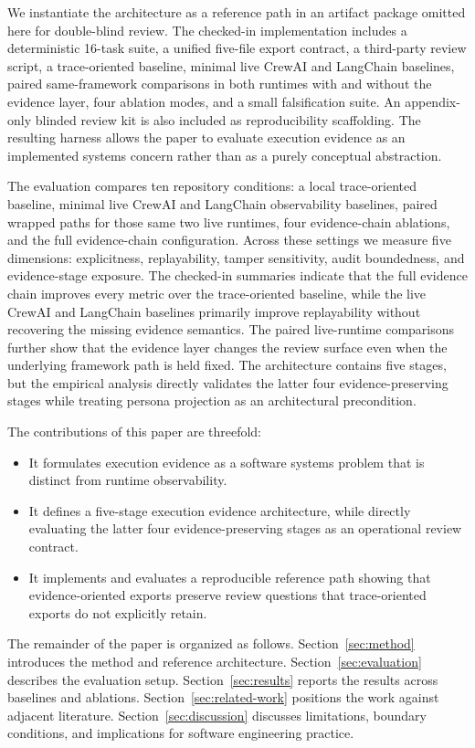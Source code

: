 We instantiate the architecture as a reference path in an artifact package omitted here for double-blind review. The checked-in implementation includes a deterministic 16-task suite, a unified five-file export contract, a third-party review script, a trace-oriented baseline, minimal live CrewAI and LangChain baselines, paired same-framework comparisons in both runtimes with and without the evidence layer, four ablation modes, and a small falsification suite. An appendix-only blinded review kit is also included as reproducibility scaffolding. The resulting harness allows the paper to evaluate execution evidence as an implemented systems concern rather than as a purely conceptual abstraction.

The evaluation compares ten repository conditions: a local trace-oriented baseline, minimal live CrewAI and LangChain observability baselines, paired wrapped paths for those same two live runtimes, four evidence-chain ablations, and the full evidence-chain configuration. Across these settings we measure five dimensions: explicitness, replayability, tamper sensitivity, audit boundedness, and evidence-stage exposure. The checked-in summaries indicate that the full evidence chain improves every metric over the trace-oriented baseline, while the live CrewAI and LangChain baselines primarily improve replayability without recovering the missing evidence semantics. The paired live-runtime comparisons further show that the evidence layer changes the review surface even when the underlying framework path is held fixed. The architecture contains five stages, but the empirical analysis directly validates the latter four evidence-preserving stages while treating persona projection as an architectural precondition.

The contributions of this paper are threefold:

\begin{itemize}
  \item It formulates execution evidence as a software systems problem that is distinct from runtime observability.
  \item It defines a five-stage execution evidence architecture, while directly evaluating the latter four evidence-preserving stages as an operational review contract.
  \item It implements and evaluates a reproducible reference path showing that evidence-oriented exports preserve review questions that trace-oriented exports do not explicitly retain.
\end{itemize}

The remainder of the paper is organized as follows. Section~\ref{sec:method} introduces the method and reference architecture. Section~\ref{sec:evaluation} describes the evaluation setup. Section~\ref{sec:results} reports the results across baselines and ablations. Section~\ref{sec:related-work} positions the work against adjacent literature. Section~\ref{sec:discussion} discusses limitations, boundary conditions, and implications for software engineering practice.
